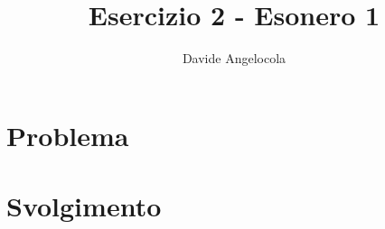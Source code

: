 \documentclass{article}
\title{Esercizio 2 - Esonero 1}
\author{Davide Angelocola}
\begin{document}
\maketitle

\section{Problema}


\section{Svolgimento}
\end{document}
